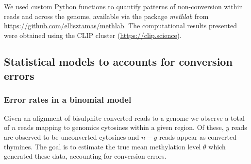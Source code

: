 \documentclass[twocolumn,twoside,lettersize]{article}
\begin{document}
We used custom Python functions to quantify patterns of non-conversion within reads and across the genome, available via the package \textit{methlab} from \url{https://github.com/ellisztamas/methlab}.
The computational results presented were obtained using the CLIP cluster (\url{https://clip.science}).

\subsection{Statistical models to accounts for conversion errors}

\subsubsection{Error rates in a binomial model} \label{sec:binomial-with-errors}

Given an alignment of bisulphite-converted reads to a genome we observe a total of $n$ reads mapping to genomics cytosines within a given region.
Of these, $y$ reads are observed to be unconverted cytosines and $n-y$ reads appear as converted thymines.
The goal is to estimate the true mean methylation level $\theta$ which generated these data, accounting for conversion errors.
\end{document}
